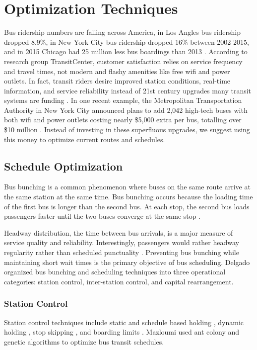 \documentclass[sigconf]{acmart}
\begin{document}
\section{Optimization Techniques}
Bus ridership numbers are falling across America, in Los Angles bus ridership dropped 8.9\%, in New York City bus ridership dropped 16\% between 2002-2015, and in 2015 Chicago had 25 million less bus boardings than 2013 \cite{Cohen01}. According to research group TransitCenter, customer satisfaction relies on service frequency and travel times, not modern and flashy amenities like free wifi and power outlets. In fact, transit riders desire improved station conditions, real-time information, and service reliability instead of 21st century upgrades many transit systems are funding \cite{TC01}. In one recent example, the Metropolitan Transportation Authority in New York City announced plans to add 2,042 high-tech buses with both wifi and power outlets costing nearly \$5,000 extra per bus, totalling over \$10 million \cite{MacMillan01}. Instead of investing in these superfluous upgrades, we suggest using this money to optimize current routes and schedules.

\subsection{Schedule Optimization}
Bus bunching is a common phenomenon where buses on the same route arrive at the same station at the same time. Bus bunching occurs because the loading time of the first bus is longer than the second bus. At each stop, the second bus loads passengers faster until the two buses converge at the same stop \cite{Andres01}. 

Headway distribution, the time between bus arrivals, is a major measure of service quality and reliability. Interestingly, passengers would rather headway regularity rather than scheduled punctuality \cite{Lin01}. Preventing bus bunching while maintaining short wait times is the primary objective of bus scheduling. Delgado \cite{Delgado01} organized bus bunching and scheduling techniques into three operational categories: station control, inter-station control, and capital rearrangement.

\subsubsection{Station Control} Station control techniques include static and schedule based holding \cite{Andres01}, dynamic holding \cite{Bartholdi01}, stop skipping \cite{Sun01}, and boarding limits \cite{Zhao01}. Mazloumi \cite{Mazloumi01} used ant colony and genetic algorithms to optimize bus transit schedules.
\end{document}
